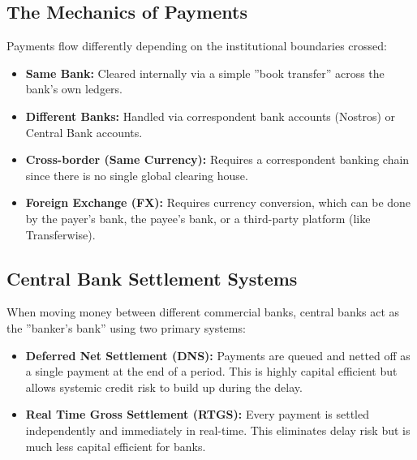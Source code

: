 \subsection{The Mechanics of Payments}
Payments flow differently depending on the institutional boundaries crossed:
\begin{itemize}
    \item \textbf{Same Bank:} Cleared internally via a simple ''book transfer'' across the bank's
          own ledgers.
    \item \textbf{Different Banks:} Handled via correspondent bank accounts (Nostros) or Central
          Bank accounts.
    \item \textbf{Cross-border (Same Currency):} Requires a correspondent banking chain since
          there is no single global clearing house.
    \item \textbf{Foreign Exchange (FX):} Requires currency conversion, which can be done by the
          payer's bank, the payee's bank, or a third-party platform (like Transferwise).
\end{itemize}

\subsection{Central Bank Settlement Systems}
When moving money between different commercial banks, central banks act as the
''banker's bank'' using two primary systems:
\begin{itemize}
    \item \textbf{Deferred Net Settlement (DNS):} Payments are queued and netted off as a single
          payment at the end of a period. This is highly capital efficient but allows
          systemic credit risk to build up during the delay.
    \item \textbf{Real Time Gross Settlement (RTGS):} Every payment is settled independently and
          immediately in real-time. This eliminates delay risk but is much less capital
          efficient for banks.
\end{itemize}

